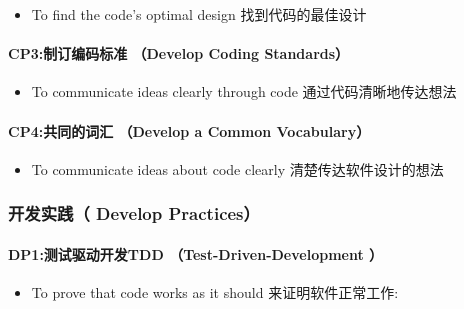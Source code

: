 \documentclass[]{article}
\providecommand{\tightlist}{%
  \setlength{\itemsep}{0pt}\setlength{\parskip}{0pt}}
\let\oldparagraph\paragraph
\renewcommand{\paragraph}[1]{\oldparagraph{#1}\mbox{}}
\begin{document}
\begin{itemize}
\tightlist
\item
  To find the code's optimal design 找到代码的最佳设计
\end{itemize}

\hypertarget{cp3ux5236ux8ba2ux7f16ux7801ux6807ux51c6-develop-coding-standards}{%
\paragraph{CP3:制订编码标准 （Develop Coding
Standards）}\label{cp3ux5236ux8ba2ux7f16ux7801ux6807ux51c6-develop-coding-standards}}

\begin{itemize}
\tightlist
\item
  To communicate ideas clearly through code 通过代码清晰地传达想法
\end{itemize}

\hypertarget{cp4ux5171ux540cux7684ux8bcdux6c47-develop-a-common-vocabulary}{%
\paragraph{CP4:共同的词汇 （Develop a Common
Vocabulary）}\label{cp4ux5171ux540cux7684ux8bcdux6c47-develop-a-common-vocabulary}}

\begin{itemize}
\tightlist
\item
  To communicate ideas about code clearly 清楚传达软件设计的想法
\end{itemize}

\hypertarget{ux5f00ux53d1ux5b9eux8df5-develop-practices}{%
\subsubsection{开发实践（ Develop
Practices）}\label{ux5f00ux53d1ux5b9eux8df5-develop-practices}}

\hypertarget{dp1ux6d4bux8bd5ux9a71ux52a8ux5f00ux53d1tdd-test-driven-development}{%
\paragraph{DP1:测试驱动开发TDD （Test-Driven-Development
）}\label{dp1ux6d4bux8bd5ux9a71ux52a8ux5f00ux53d1tdd-test-driven-development}}

\begin{itemize}
\tightlist
\item
  To prove that code works as it should 来证明软件正常工作:\\
\end{itemize}
\end{document}
